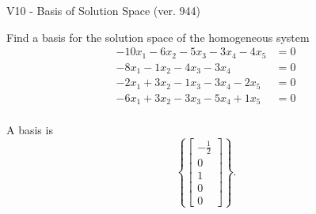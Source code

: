 \begin{exercise}
  \begin{exerciseTitle}V10 - Basis of Solution Space (ver. 944)\end{exerciseTitle}
  \begin{exerciseStatement}
    Find a basis for the solution space of the homogeneous system 
\begin{align*}
 -10 x_ 1 -6 x_ 2 -5 x_ 3 -3 x_ 4 -4 x_ 5 &= 0  \\ 
  -8 x_ 1 -1 x_ 2 -4 x_ 3 -3 x_ 4 &= 0  \\ 
  -2 x_ 1 + 3 x_ 2 -1 x_ 3 -3 x_ 4 -2 x_ 5 &= 0  \\ 
  -6 x_ 1 + 3 x_ 2 -3 x_ 3 -5 x_ 4 + 1 x_ 5 &= 0  \\ 
 \end{align*}


 
  \end{exerciseStatement}

  \begin{exerciseAnswer}
   A basis is   
\[\left\{\left[\begin{array}{c}
-\frac{1}{2} \\
0 \\
1 \\
0 \\
0
\end{array}\right]\right\}.\]

  


  \end{exerciseAnswer}
\end{exercise}